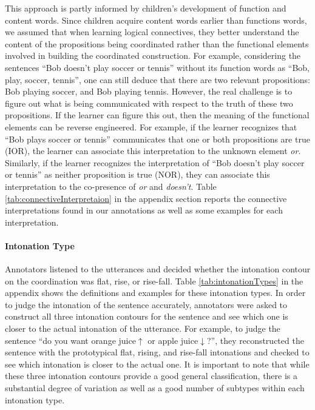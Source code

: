 \documentclass[floatsintext,man]{apa6}
\theoremstyle{definition}
\theoremstyle{definition}
\theoremstyle{definition}
\theoremstyle{remark}
\begin{document}
This approach is partly informed by children's development of function
and content words. Since children acquire content words earlier than
functions words, we assumed that when learning logical connectives, they
better understand the content of the propositions being coordinated
rather than the functional elements involved in building the coordinated
construction. For example, considering the sentences \enquote{Bob
doesn't play soccer or tennis} without its function words as
\enquote{Bob, play, soccer, tennis}, one can still deduce that there are
two relevant propositions: Bob playing soccer, and Bob playing tennis.
However, the real challenge is to figure out what is being communicated
with respect to the truth of these two propositions. If the learner can
figure this out, then the meaning of the functional elements can be
reverse engineered. For example, if the learner recognizes that
\enquote{Bob plays soccer or tennis} communicates that one or both
propositions are true (IOR), the learner can associate this
interpretation to the unknown element \emph{or}. Similarly, if the
learner recognizes the interpretation of \enquote{Bob doesn't play
soccer or tennis} as neither proposition is true (NOR), they can
associate this interpretation to the co-presence of \emph{or} and
\emph{doesn't}. Table \ref{tab:connectiveInterpretaion} in the appendix
section reports the connective interpretations found in our annotations
as well as some examples for each interpretation.

\paragraph{Intonation Type}\label{intonation-type}

Annotators listened to the utterances and decided whether the intonation
contour on the coordination was flat, rise, or rise-fall. Table
\ref{tab:intonationTypes} in the appendix shows the definitions and
examples for these intonation types. In order to judge the intonation of
the sentence accurately, annotators were asked to construct all three
intonation contours for the sentence and see which one is closer to the
actual intonation of the utterance. For example, to judge the sentence
\enquote{do you want orange juice\(\uparrow\) or apple
juice\(\downarrow\)?}, they reconstructed the sentence with the
prototypical flat, rising, and rise-fall intonations and checked to see
which intonation is closer to the actual one. It is important to note
that while these three intonation contours provide a good general
classification, there is a substantial degree of variation as well as a
good number of subtypes within each intonation type.
\end{document}
